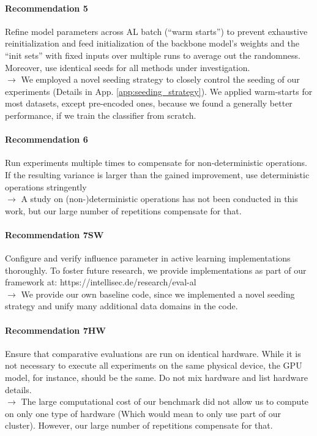 \documentclass[]{article}
\begin{document}
\paragraph{Recommendation 5} Refine model parameters across AL
batch (“warm starts”) to prevent exhaustive reinitialization and feed initialization of the backbone model’s
weights and the “init sets” with fixed inputs over multiple runs to average out the randomness. Moreover, use
identical seeds for all methods under investigation.\\
$\rightarrow$ We employed a novel seeding strategy to closely control the seeding of our experiments (Details in App. \ref{app:seeding_strategy}). We applied warm-starts for most datasets, except pre-encoded ones, because we found a generally better performance, if we train the classifier from scratch. 

\paragraph{Recommendation 6} Run experiments multiple times to
compensate for non-deterministic operations. If the resulting variance is larger than the gained improvement,
use deterministic operations stringently\\
$\rightarrow$ A study on (non-)deterministic operations has not been conducted in this work, but our large number of repetitions compensate for that.

\paragraph{Recommendation 7SW} Configure and verify influence parameter in active learning implementations thoroughly. To foster future research, we
provide implementations as part of our framework at:
https://intellisec.de/research/eval-al\\
$\rightarrow$ We provide our own baseline code, since we implemented a novel seeding strategy and unify many additional data domains in the code.

\paragraph{Recommendation 7HW} Ensure that comparative evaluations are run on identical hardware. While it is not
necessary to execute all experiments on the same physical device, the GPU model, for instance, should be the
same. Do not mix hardware and list hardware details.\\
$\rightarrow$ The large computational cost of our benchmark did not allow us to compute on only one type of hardware (Which would mean to only use part of our cluster). However, our large number of repetitions compensate for that.
\end{document}

